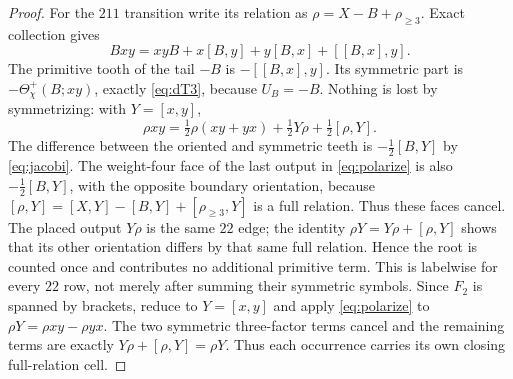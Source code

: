 \documentclass[10pt,a4paper]{amsart}
\theoremstyle{remark}
\begin{document}
\begin{proof}
For the $211$ transition write its relation as
$\rho=X-B+\rho_{\ge3}$.  Exact collection gives
\begin{equation}
 Bxy=xyB+x[B,y]+y[B,x]+[[B,x],y].                       \label{eq:Bxy}
\end{equation}
The primitive tooth of the tail $-B$ is $-[[B,x],y]$.
Its symmetric part is $-\Theta^+_\chi(B;xy)$, exactly
\eqref{eq:dT3}, because
$U_B=-B$.  Nothing is lost by symmetrizing: with $Y=[x,y]$,
\begin{equation}
 \rho xy=\tfrac12\rho(xy+yx)+\tfrac12Y\rho
                              +\tfrac12[\rho,Y].         \label{eq:polarize}
\end{equation}
The difference between the oriented and symmetric teeth is
$-\frac12[B,Y]$ by \eqref{eq:jacobi}.  The weight-four face of the
last output in \eqref{eq:polarize} is also $-\frac12[B,Y]$, with the
opposite boundary orientation,
because
$[\rho,Y]=[X,Y]-[B,Y]+[\rho_{\ge3},Y]$ is a full relation.
Thus these faces cancel.  The placed output $Y\rho$ is the same $22$
edge; the identity $\rho Y=Y\rho+[\rho,Y]$ shows that its other
orientation differs by that same full relation.  Hence the root is
counted once and contributes no additional primitive term.
This is labelwise for every $22$ row, not merely after summing their
symmetric symbols.  Since $F_2$ is spanned by brackets, reduce to
$Y=[x,y]$ and apply \eqref{eq:polarize} to
$\rho Y=\rho xy-\rho yx$.  The two symmetric three-factor terms cancel
and the remaining terms are exactly
$Y\rho+[\rho,Y]=\rho Y$.  Thus each occurrence carries its own closing
full-relation cell.


\end{proof}
\end{document}
